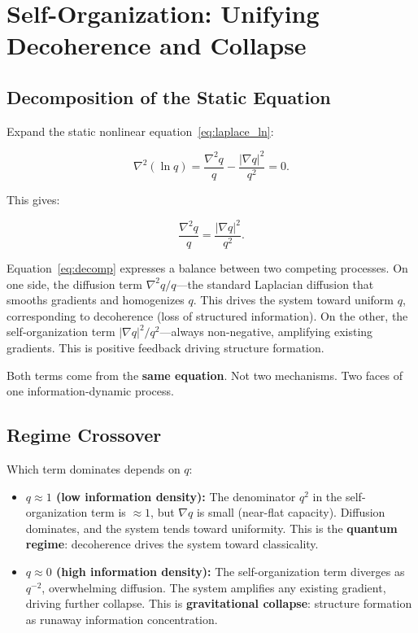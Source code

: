 \documentclass[aps,prd,twocolumn,showpacs,superscriptaddress,preprintnumbers]{revtex4-2}
\begin{document}
\section{Self-Organization: Unifying Decoherence and Collapse}
\label{sec:selforg}

\subsection{Decomposition of the Static Equation}

Expand the static nonlinear equation~\eqref{eq:laplace_ln}:

\begin{equation}
\nabla^2(\ln q) = \frac{\nabla^2 q}{q} - \frac{|\nabla q|^2}{q^2} = 0.
\label{eq:expand_ln}
\end{equation}

This gives:

\begin{equation}
\boxed{\frac{\nabla^2 q}{q} = \frac{|\nabla q|^2}{q^2}}.
\label{eq:decomp}
\end{equation}

Equation~\eqref{eq:decomp} expresses a balance between two competing processes.
On one side, the diffusion term $\nabla^2 q/q$---the standard Laplacian diffusion that smooths gradients and homogenizes $q$.
This drives the system toward uniform $q$, corresponding to decoherence (loss of structured information).
On the other, the self-organization term $|\nabla q|^2/q^2$---always non-negative, amplifying existing gradients.
This is positive feedback driving structure formation.

Both terms come from the \textbf{same equation}.
Not two mechanisms. Two faces of one information-dynamic process.

\subsection{Regime Crossover}

Which term dominates depends on $q$:

\begin{itemize}
    \item \textbf{$q\approx1$ (low information density):} The denominator $q^2$ in the self-organization term is $\approx1$, but $\nabla q$ is small (near-flat capacity). Diffusion dominates, and the system tends toward uniformity. This is the \textbf{quantum regime}: decoherence drives the system toward classicality.

    \item \textbf{$q\approx0$ (high information density):} The self-organization term diverges as $q^{-2}$, overwhelming diffusion. The system amplifies any existing gradient, driving further collapse. This is \textbf{gravitational collapse}: structure formation as runaway information concentration.
\end{itemize}
\end{document}
